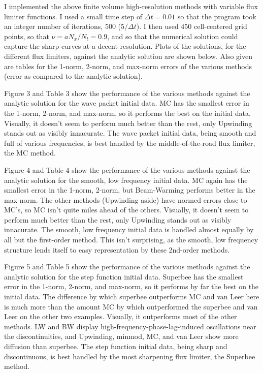 \documentclass[12pt]{article}
\begin{document}
I implemented the above finite volume high-resolution methods with variable flux limiter functions.  I used a small time step of $\Delta t = 0.01$ so that the program took an integer number of iterations, $500$ ($5/\Delta t$).  I then used $450$ cell-centered grid points, so that $\nu=a N_x / N_t = 0.9$, and so that the numerical solution could capture the sharp curves at a decent resolution.  Plots of the solutions, for the different flux limiters, against the analytic solution are shown below.  Also given are tables for the 1-norm, 2-norm, and max-norm errors of the various methods (error as compared to the analytic solution).

Figure 3 and Table 3 show the performance of the various methods against the analytic solution for the wave packet initial data.  MC has the smallest error in the 1-norm, 2-norm, and max-norm, so it performs the best on the initial data.  Visually, it doesn't seem to perform much better than the rest, only Upwinding stands out as visibly innacurate.  The wave packet initial data, being smooth and full of various frequencies, is best handled by the middle-of-the-road flux limiter, the MC method.

Figure 4 and Table 4 show the performance of the various methods against the analytic solution for the smooth, low frequency initial data.  MC again has the smallest error in the 1-norm, 2-norm, but Beam-Warming performs better in the max-norm. The other methods (Upwinding aside) have normed errors close to MC's, so MC isn't quite miles ahead of the others.  Visually, it doesn't seem to perform much better than the rest, only Upwinding stands out as visibly innacurate.  The smooth, low frequency initial data is handled almost equally by all but the first-order method.  This isn't surprising, as the smooth, low frequency structure lends itself to easy representation by these 2nd-order methods.

Figure 5 and Table 5 show the performance of the various methods against the analytic solution for the step function initial data.  Superbee has the smallest error in the 1-norm, 2-norm, and max-norm, so it performs by far the best on the initial data.  The difference by which superbee outperforms MC and van Leer here is much more than the amount MC by which outperformed the superbee and van Leer on the other two examples. Visually, it outperforms most of the other methods. LW and BW display high-frequency-phase-lag-induced oscillations near the discontinuities, and Upwinding, minmod, MC, and van Leer show more diffusion than superbee.  The step function initial data, being sharp and discontinuous, is best handled by the most sharpening flux limiter, the Superbee method.
\end{document}
